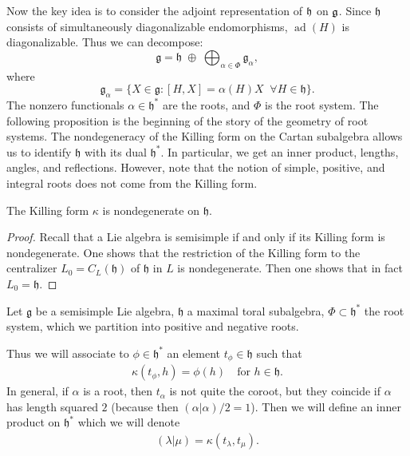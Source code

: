 \documentclass[12pt]{article}
\begin{document}
Now the key idea is to consider the adjoint representation of $\mathfrak{h}$ on $\mathfrak{g}$. Since $\mathfrak{h}$ consists of simultaneously diagonalizable endomorphisms, $\operatorname{ad}(H)$ is diagonalizable. Thus we can decompose:
\[
    \mathfrak{g} = \mathfrak{h} \;\oplus\; \bigoplus_{\alpha \in \Phi} \mathfrak{g}_\alpha,
\]
where
\[
    \mathfrak{g}_\alpha = \{ X \in \mathfrak{g} : [H,X] = \alpha(H) X \;\;\forall H\in \mathfrak{h}\}.
\]
The nonzero functionals $\alpha \in \mathfrak{h}^*$ are the roots, and $\Phi$ is the root system. The following proposition is the beginning of the story of the geometry of root systems. The nondegeneracy of the Killing form on the Cartan subalgebra allows us to identify $\mathfrak{h}$ with its dual $\mathfrak{h}^*$. In particular, we get an inner product, lengths, angles, and reflections. However, note that the notion of simple, positive, and integral roots does not come from the Killing form.

\begin{proposition}[Humphreys 8.2]
    The Killing form $\kappa$ is nondegenerate on $\mathfrak{h}$.
\end{proposition}

\begin{proof}

    Recall that a Lie algebra is semisimple if and only if its Killing form is nondegenerate. One shows that the restriction of the Killing form to the centralizer $L_0 = C_L(\mathfrak{h})$ of $\mathfrak{h}$ in $L$ is nondegenerate. Then one shows that in fact $L_0 = \mathfrak{h}$.
\end{proof}

Let $\mathfrak{g}$ be a semisimple Lie algebra, $\mathfrak{h}$ a maximal toral subalgebra, $\Phi \subset \mathfrak{h}^*$ the root system, which we partition into positive and negative roots.

Thus we will associate to $\phi \in \mathfrak{h}^*$ an element $t_\phi \in \mathfrak{h}$ such that
\begin{align*}
    \kappa(t_\phi, h) = \phi(h) \quad \text{for } h \in \mathfrak{h}.
\end{align*}
In general, if $\alpha$ is a root, then $t_\alpha$ is not quite the coroot, but they coincide if $\alpha$ has length squared $2$ (because then $(\alpha|\alpha)/2 = 1$).
Then we will define an inner product on $\mathfrak{h}^*$ which we will denote
\begin{align*}
    (\lambda | \mu) = \kappa(t_\lambda, t_\mu).
\end{align*}
\end{document}
